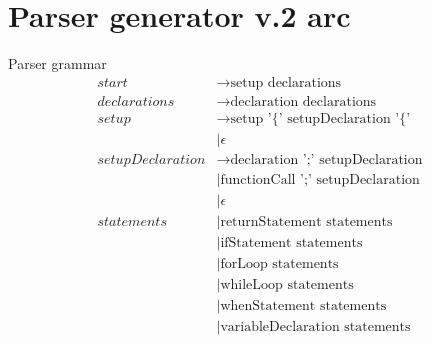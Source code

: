 \section{Parser generator v.2 arc}\label{sec:parsergeneratorarc}

Parser grammar
\begin{align*}
    start                   & \to \text{setup declarations}                                                                                     \\
    declarations            & \to \text{declaration declarations}                                                                               \\
    setup                   & \to \text{setup '\{' setupDeclaration '\{'}                                                                       \\
                            & \mid \epsilon                                                                                                     \\
    setupDeclaration        & \to \text{declaration ';' setupDeclaration}                                                                       \\
                            & \mid \text{functionCall ';' setupDeclaration}                                                                     \\
                            & \mid \epsilon                                                                                                     \\
    statements              & \mid \text{returnStatement statements}                                                                            \\
                            & \mid \text{ifStatement statements}                                                                                \\
                            & \mid \text{forLoop statements}                                                                                    \\
                            & \mid \text{whileLoop statements}                                                                                  \\
                            & \mid \text{whenStatement statements}                                                                              \\
                            & \mid \text{variableDeclaration statements}                                                                        \\

\end{align*}
